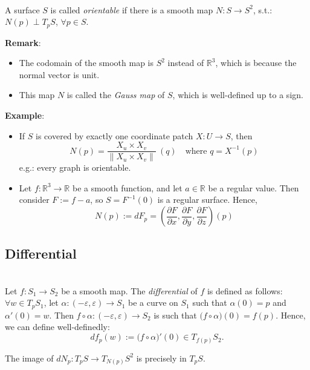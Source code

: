 \\
A surface $S$ is called \textit{orientable} if there is a smooth map $N: S\to S^2$, s.t.: $N(p)\perp T_pS$, $\forall p\in S$.

\noindent\textbf{Remark}: \begin{itemize}
    \item The codomain of the smooth map is $S^2$ instead of $\mathbb{R}^3$, which is because the normal vector is unit.
    \item This map $N$ is called the \textit{Gauss map} of $S$, which is well-defined up to a sign.
\end{itemize}

\noindent\textbf{Example}: 
\noindent\begin{itemize}
\item If $S$ is covered by exactly one coordinate patch $X: U\to S$, then
\[
N(p) = \frac{X_u\times X_v}{\|X_u\times X_v\|}\ (q) \quad\text{where } q = X^{-1}(p)
\]
e.g.: every graph is orientable.
\item Let $f: \mathbb{R}^3\to\mathbb{R}$ be a smooth function, and let $a\in\mathbb{R}$ be a regular value. Then consider $F := f - a$, so $S = F^{-1}(0)$ is a regular surface. Hence,
\[
N(p) := dF_p = \left(\frac{\partial F}{\partial x}, \frac{\partial F}{\partial y}, \frac{\partial F}{\partial z}\right)(p)
\]
\end{itemize}

\subsection{Differential}

\\
Let $f: S_1\to S_2$ be a smooth map. The \textit{differential} of $f$ is defined as follows: $\forall w\in T_pS_1$, let $\alpha: (-\varepsilon, \varepsilon)\to S_1$ be a curve on $S_1$ such that $\alpha(0) = p$ and $\alpha'(0) = w$. Then $f\circ\alpha: (-\varepsilon, \varepsilon)\to S_2$ is such that $\big(f\circ\alpha\big)(0) = f(p)$. Hence, we can define well-definedly:
\[
df_p(w) := \big(f\circ\alpha\big)'(0)\in T_{f(p)}S_2.
\]

\begin{proposition}
The image of $dN_p: T_pS\to T_{N(p)}S^2$ is precisely in $T_pS$.
\end{proposition}

